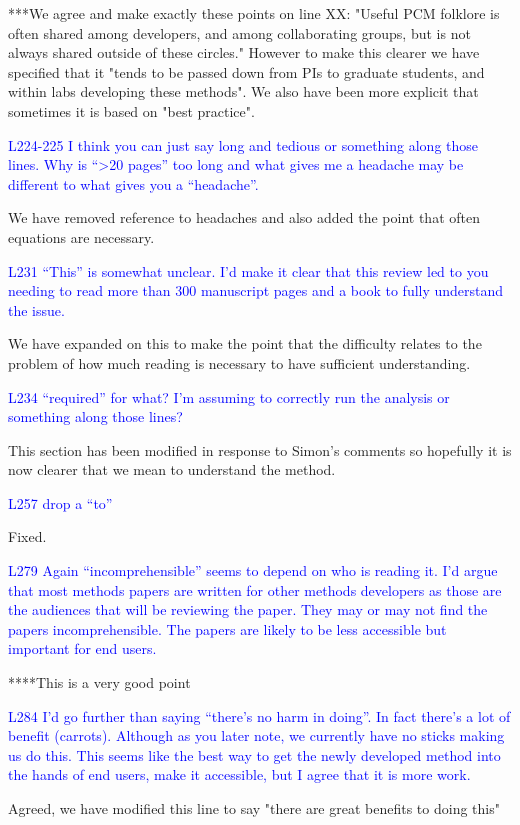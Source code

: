 \documentclass[12pt]{letter}
\begin{document}
\begin{letter}{}
***We agree and make exactly these points on line XX: "Useful PCM folklore is often shared among developers, and among collaborating groups, but is not always shared outside of these circles." However to make this clearer we have specified that it "tends to be passed down from PIs to graduate students, and within labs developing these methods". We also have been more explicit that sometimes it is based on "best practice".

\textcolor{blue}{L224-225 I think you can just say long and tedious or something along those lines. Why is “>20 pages” too long and what gives me a headache may be different to what gives you a “headache”.}

We have removed reference to headaches and also added the point that often equations are necessary.

\textcolor{blue}{L231 “This” is somewhat unclear. I'd make it clear that this review led to you needing to read more than 300 manuscript pages and a book to fully understand the issue.}

We have expanded on this to make the point that the difficulty relates to the problem of how much reading is necessary to have sufficient understanding. 

\textcolor{blue}{L234 “required” for what? I'm assuming to correctly run the analysis or something along those lines?}

This section has been modified in response to Simon's comments so hopefully it is now clearer that we mean to understand the method.

\textcolor{blue}{L257 drop a “to”}

Fixed.

\textcolor{blue}{L279 Again “incomprehensible” seems to depend on who is reading it. I'd argue that most methods papers are written for other methods developers as those are the audiences that will be reviewing the paper. They may or may not find the papers incomprehensible. The papers are likely to be less accessible but important for end users.}

****This is a very good point

\textcolor{blue}{L284 I'd go further than saying “there's no harm in doing”. In fact there's a lot of benefit (carrots). Although as you later note, we currently have no sticks making us do this. This seems like the best way to get the newly developed method into the hands of end users, make it accessible, but I agree that it is more work.}

Agreed, we have modified this line to say "there are great benefits to doing this"


\end{letter}
\end{document}
